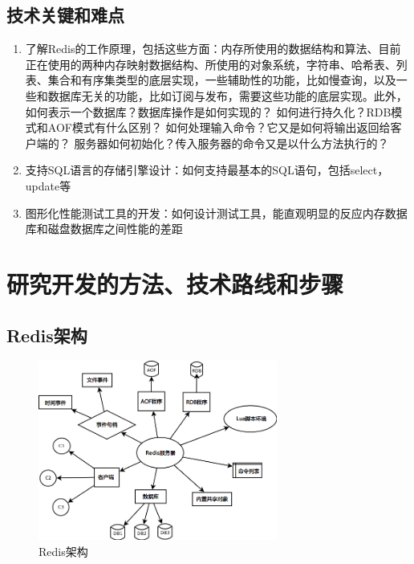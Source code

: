 \documentclass[proposal]{zjutreport}
\begin{document}
\section{技术关键和难点}
\begin{enumerate}[label=（\arabic*）]
\item{了解Redis的工作原理，包括这些方面：内存所使用的数据结构和算法、目前正在使用的两种内存映射数据结构、所使用的对象系统，字符串、哈希表、列表、集合和有序集类型的底层实现，一些辅助性的功能，比如慢查询，以及一些和数据库无关的功能，比如订阅与发布，需要这些功能的底层实现。此外，如何表示一个数据库？数据库操作是如何实现的？
如何进行持久化？RDB模式和AOF模式有什么区别？
如何处理输入命令？它又是如何将输出返回给客户端的？
服务器如何初始化？传入服务器的命令又是以什么方法执行的？}
\item{支持SQL语言的存储引擎设计：如何支持最基本的SQL语句，包括select，update等}
\item{图形化性能测试工具的开发：如何设计测试工具，能直观明显的反应内存数据库和磁盘数据库之间性能的差距}
\end{enumerate}

\newpage

\chapter{研究开发的方法、技术路线和步骤}
\section{Redis架构}
\begin{figure}[htbp]
\centering
\includegraphics[width=0.7\textwidth]{redis-server}
\caption{Redis架构}\label{fig:redis-server}
\vspace{\baselineskip}
\end{figure}
\end{document}

